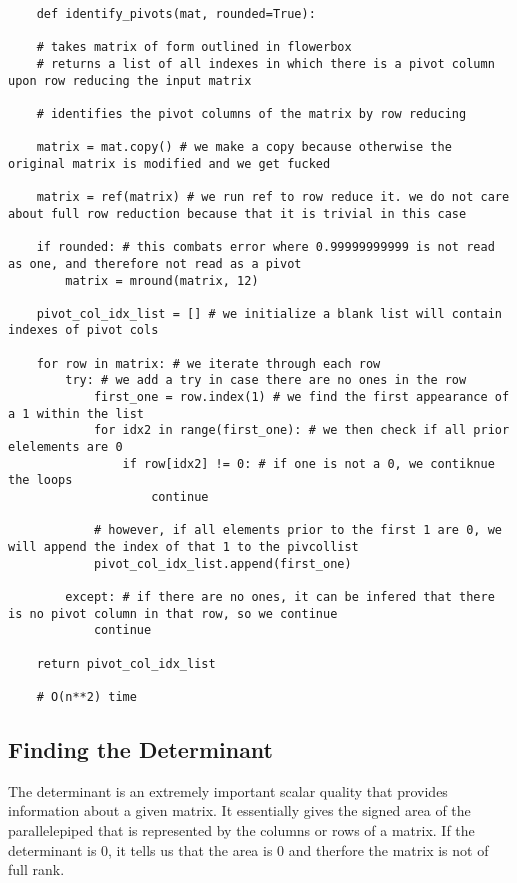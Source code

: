 \documentclass[12pt, a4paper]{article}
\begin{document}
\begin{lstlisting}
    def identify_pivots(mat, rounded=True):

    # takes matrix of form outlined in flowerbox
    # returns a list of all indexes in which there is a pivot column upon row reducing the input matrix

    # identifies the pivot columns of the matrix by row reducing

    matrix = mat.copy() # we make a copy because otherwise the original matrix is modified and we get fucked

    matrix = ref(matrix) # we run ref to row reduce it. we do not care about full row reduction because that it is trivial in this case
    
    if rounded: # this combats error where 0.99999999999 is not read as one, and therefore not read as a pivot
        matrix = mround(matrix, 12)

    pivot_col_idx_list = [] # we initialize a blank list will contain indexes of pivot cols

    for row in matrix: # we iterate through each row
        try: # we add a try in case there are no ones in the row
            first_one = row.index(1) # we find the first appearance of a 1 within the list
            for idx2 in range(first_one): # we then check if all prior elelements are 0
                if row[idx2] != 0: # if one is not a 0, we contiknue the loops
                    continue

            # however, if all elements prior to the first 1 are 0, we will append the index of that 1 to the pivcollist
            pivot_col_idx_list.append(first_one)

        except: # if there are no ones, it can be infered that there is no pivot column in that row, so we continue
            continue 

    return pivot_col_idx_list    

    # O(n**2) time
\end{lstlisting}


\subsection{Finding the Determinant}

The determinant is an extremely important scalar quality that provides information about a given matrix. 
It essentially gives the signed area of the parallelepiped that is represented by the columns or rows of a matrix. 
If the determinant is 0, it tells us that the area is 0 and therfore the matrix is not of full rank.
\end{document}

